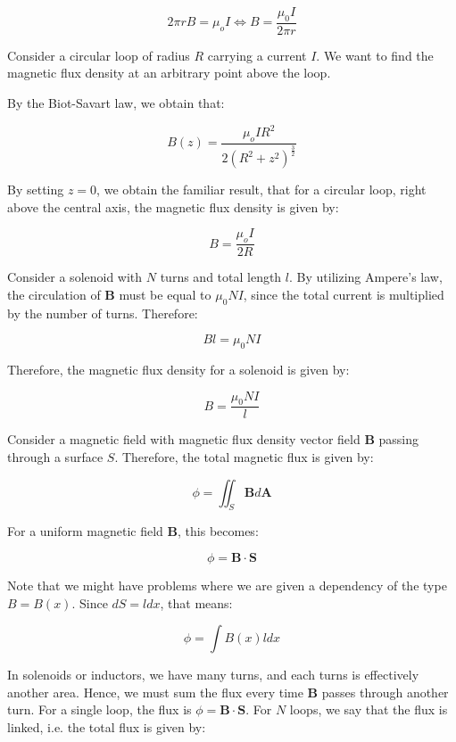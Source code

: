 \documentclass{article}
\begin{document}
\begin{proposition}
\[ 2\pi rB = \mu_oI \iff B = \frac{\mu_0I}{2\pi r} \]

\begin{example}
    Consider a circular loop of radius $R$ carrying a current $I$. We want to find the magnetic flux density at an arbitrary point above the loop.

    By the Biot-Savart law, we obtain that:

    \[ B(z) = \frac{\mu_oIR^2}{2\left(R^2 + z^2\right)^{\frac{3}{2}}} \]

    By setting $z = 0$, we obtain the familiar result, that for a circular loop, right above the central axis, the magnetic flux density is given by:

    \[ B = \frac{\mu_oI}{2R} \]
\end{example}

\begin{example}
    Consider a solenoid with $N$ turns and total length $l$. By utilizing Ampere's law, the circulation of $\mathbf{B}$ must be equal to $\mu_0NI$, since the total current is multiplied by the number of turns. Therefore:

    \[ Bl = \mu_0NI \]

    Therefore, the magnetic flux density for a solenoid is given by:

    \[ B = \frac{\mu_0NI}{l} \]
\end{example}

\begin{definition}
    Consider a magnetic field with magnetic flux density vector field $\mathbf{B}$ passing through a surface $S$. Therefore, the total magnetic flux is given by:

    \[ \phi = \iint_S \mathbf{B}d\mathbf{A} \]

    For a uniform magnetic field $\mathbf{B}$, this becomes:

    \[ \phi = \mathbf{B} \cdot \mathbf{S} \]

    Note that we might have problems where we are given a dependency of the type $B = B(x)$. Since $dS = ldx$, that means:

    \[ \phi = \int B(x)ldx \]
\end{definition}

\begin{proposition}
    In solenoids or inductors, we have many turns, and each turns is effectively another area. Hence, we must sum the flux every time $\mathbf{B}$ passes through another turn. For a single loop, the flux is $\phi = \mathbf{B} \cdot \mathbf{S}$. For $N$ loops, we say that the flux is linked, i.e. the total flux is given by:


\end{proposition}
\end{proposition}
\end{document}
